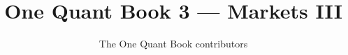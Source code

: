 \documentclass[11pt,a4paper,twoside,openany]{book}
\title{One Quant Book 3 --- Markets III}
\author{The One Quant Book contributors}
\date{\bookdate}
\begin{document}
\frontmatter



\tableofcontents

\mainmatter


\appendix
\part{\omsolutionspart}


\backmatter
\printindex
\end{document}

